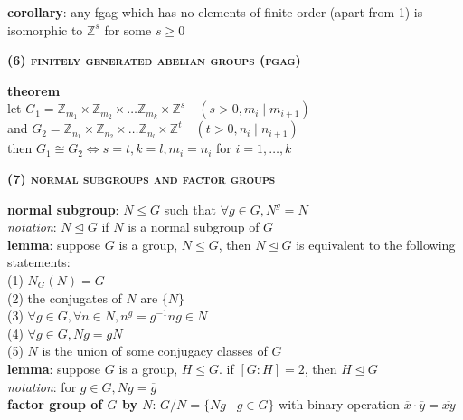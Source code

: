 \documentclass[a4paper]{article}
\begin{document}
\begin{multicols}{2}
\begin{framed}
	\noindent
	\textbf{corollary}: any fgag which has no elements of finite order (apart from 1) is isomorphic to $\mathbb{Z}^s$ for some $s \geq 0$
\end{framed}

\begin{framed}
	\begin{center}
		\textbf{\textsc{(6) finitely generated abelian groups (fgag)}}
	\end{center}
	
	\noindent
	\textbf{theorem}\\
	let $G_1 = \mathbb{Z}_{m_1} \times \mathbb{Z}_{m_2} \times \dots \mathbb{Z}_{m_k} \times \mathbb{Z}^s \quad (s > 0, m_i \; \vert \; m_{i+1})$\\
	and $G_2 = \mathbb{Z}_{n_1} \times \mathbb{Z}_{n_2} \times \dots \mathbb{Z}_{n_l} \times \mathbb{Z}^t \quad (t > 0, n_i \; \vert \; n_{i+1})$\\
	then $G_1 \cong G_2 \iff s = t, k = l, m_i = n_i$ for $i = 1, \dots, k$
\end{framed}

\begin{framed}
	\begin{center}
		\textbf{\textsc{(7) normal subgroups and factor groups}}
	\end{center}
	
	\noindent
	\textbf{normal subgroup}: $N \leq G$ such that $\forall g \in G, N^g = N$\\
	\textit{notation}: $N \unlhd G$ if $N$ is a normal subgroup of $G$\\
	
	\noindent
	\textbf{lemma}: suppose $G$ is a group, $N \leq G$, then $N \unlhd G$ is equivalent to the following statements:\\
	(1) $N_G(N) = G$\\
	(2) the conjugates of $N$ are $\{N\}$\\
	(3) $\forall g \in G, \forall n \in N, n^g = g^{-1}ng \in N$\\
	(4) $\forall g \in G, Ng = gN$\\
	(5) $N$ is the union of some conjugacy classes of $G$\\
	
	\noindent
	\textbf{lemma}: suppose $G$ is a group, $H \leq G$. if $[G:H] = 2$, then $H \unlhd G$\\
	
	\noindent
	\textit{notation}: for $g \in G, Ng = \overline{g}$\\
	\textbf{factor group of $G$ by $N$}: $G/N = \{Ng \; \vert \; g \in G\}$ with binary operation $\overline{x} \cdot \overline{y} = \overline{xy}$\\
	

\end{framed}
\end{multicols}
\end{document}
